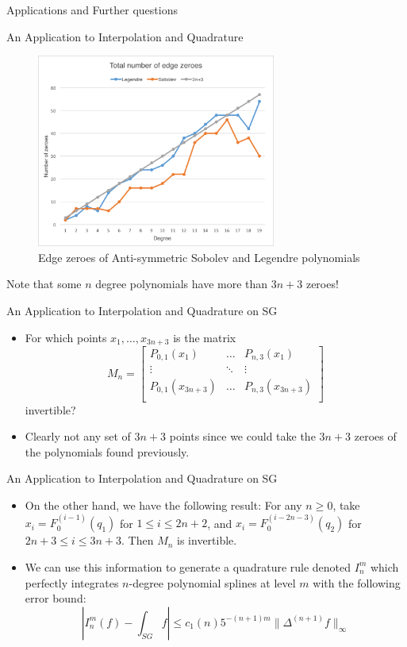 \documentclass[xcolor = dvipsnames]{beamer}
\begin{document}
\begin{section}{Applications and Further questions}
\begin{frame}{An Application to Interpolation and Quadrature}
    \begin{figure}
        \centering
        \includegraphics[width=0.7\textwidth]{images/Picture1.png}
        \caption{Edge zeroes of Anti-symmetric Sobolev and Legendre polynomials}
    \end{figure}
    
    Note that some $n$ degree polynomials have more than $3n+3$ zeroes! 
\end{frame}

\begin{frame}{An Application to Interpolation and Quadrature on SG}
    \begin{itemize}
        \item For which points $x_1,\ldots, x_{3n+3}$ is the matrix 
        $$M_n = \begin{bmatrix}P_{0,1}(x_1) & \ldots & P_{n,3}(x_1) \\\vdots & \ddots & \vdots \\P_{0,1}(x_{3n+3}) & \ldots & P_{n,3}(x_{3n+3})\\\end{bmatrix}$$
        invertible?
        \item Clearly not any set of $3n + 3$ points since we could take the $3n + 3$ zeroes of the polynomials found previously.
    \end{itemize}
\end{frame}

\begin{frame}{An Application to Interpolation and Quadrature on SG}
    
    \begin{itemize}
        \item On the other hand, we have the following result: For any $n\ge 0$, take $x_i=F_0^{(i-1)}(q_1)$ for $1\le i\le 2n+2$, and $x_i=F_0^{(i-2n-3)}(q_2)$ for $2n+3\le i \le 3n+3$. Then $M_n$ is invertible.
        \item We can use this information to generate a quadrature rule denoted $I_{n}^{m}$ which perfectly integrates $n$-degree polynomial splines at level $m$ with the following error bound: 
        $$\left|I_n^m(f) - \int_{SG}f\right|\leq c_1(n)5^{-(n+1)m}\|\Delta^{(n+1)}f\|_\infty$$
    \end{itemize}
\end{frame}


\end{section}
\end{document}
